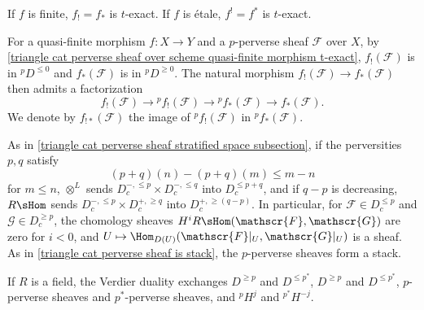 \begin{corollary}\label{triangle cat perverse sheaf over scheme finite etale morphism t-exact}
If $f$ is finite, $f_!=f_*$ is $t$-exact. If $f$ is \'etale, $f^!=f^*$ is $t$-exact.
\end{corollary}

For a quasi-finite morphism $f:X\to Y$ and a $p$-perverse sheaf $\mathscr{F}$ over $X$, by \cref{triangle cat perverse sheaf over scheme quasi-finite morphism t-exact}, $f_!(\mathscr{F})$ is in ${^pD^{\leq 0}}$ and $f_*(\mathscr{F})$ is in ${^pD^{\geq 0}}$. The natural morphism $f_!(\mathscr{F})\to f_*(\mathscr{F})$ then admits a factorization
\begin{equation}\label{triangle cat perverse sheaf over scheme f_! to f_*-1}
f_!(\mathscr{F})\to {^pf_!}(\mathscr{F})\to {^pf_*}(\mathscr{F})\to f_*(\mathscr{F}).
\end{equation}
We denote by $f_{!*}(\mathscr{F})$ the image of ${^pf_!}(\mathscr{F})$ in ${^pf_*}(\mathscr{F})$.\par

As in \cref{triangle cat perverse sheaf stratified space subsection}, if the perversities $p,q$ satisfy 
\[(p+q)(n)-(p+q)(m)\leq m-n\]
for $m\leq n$, $\otimes^L$ sends $D_c^{-,\leq p}\times D_c^{-,\leq q}$ into $D^{\leq p+q}_c$, and if $q-p$ is decreasing, $R\sHom$ sends $D_c^{-,\leq p}\times D_c^{+,\geq q}$ into $D_c^{+,\geq(q-p)}$. In particular, for $\mathscr{F}\in D_c^{\leq p}$ and $\mathscr{G}\in D_c^{\geq p}$, the chomology sheaves $H^iR\sHom(\mathscr{F},\mathscr{G})$ are zero for $i<0$, and $U\mapsto\Hom_{D(U)}(\mathscr{F}|_U,\mathscr{G}|_U)$ is a sheaf. As in \cref{triangle cat perverse sheaf is stack}, the $p$-perverse sheaves form a stack.\par
If $R$ is a field, the Verdier duality exchanges $D^{\geq p}$ and $D^{\leq p^*}$, $D^{\geq p}$ and $D^{\leq p^*}$, $p$-perverse sheaves and $p^*$-perverse sheaves, and ${^pH^j}$ and ${^{p^*}H^{-j}}$.

